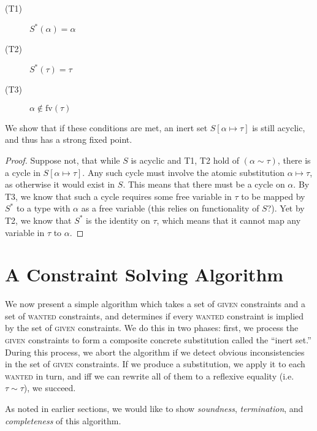 \documentclass[10pt, letterpaper, oneside]{article}
\newcommand{\fv}{\mathrm{fv}}
\begin{document}
\begin{description}
\item[(T1)] \(S^\ast(\alpha) = \alpha\)
\item[(T2)] \(S^\ast(\tau) = \tau\)
\item[(T3)] \(\alpha \notin \fv(\tau)\)
\end{description}

We show that if these conditions are met, an inert set \(S[\alpha \mapsto \tau]\) is still acyclic, and thus has a strong fixed point.

\begin{proof}
  Suppose not, that while \(S\) is acyclic and T1, T2 hold of \((\alpha \sim \tau)\), there is a cycle in \(S[\alpha \mapsto \tau]\). Any such cycle must involve the atomic substitution \(\alpha \mapsto \tau\), as otherwise it would exist in \(S\). This means that there must be a cycle on \(\alpha\). By T3, we know that such a cycle requires some free variable in \(\tau\) to be mapped by \(S^\ast\) to a type with \(\alpha\) as a free variable (this relies on functionality of \(S\)?). Yet by T2, we know that \(S^\ast\) is the identity on \(\tau\), which means that it cannot map any variable in \(\tau\) to \(\alpha\).
\end{proof}



\section{A Constraint Solving Algorithm}

We now present a simple algorithm which takes a set of \textsc{given} constraints and a set of \textsc{wanted} constraints, and determines if every \textsc{wanted} constraint is implied by the set of \textsc{given} constraints. We do this in two phases: first, we process the \textsc{given} constraints to form a composite concrete substitution called the ``inert set.'' During this process, we abort the algorithm if we detect obvious inconsistencies in the set of \textsc{given} constraints. If we produce a substitution, we apply it to each \textsc{wanted} in turn, and iff we can rewrite all of them to a reflexive equality (i.e. \(\tau \sim \tau\)), we succeed.

As noted in earlier sections, we would like to show \emph{soundness}, \emph{termination}, and \emph{completeness} of this algorithm.
\end{document}
